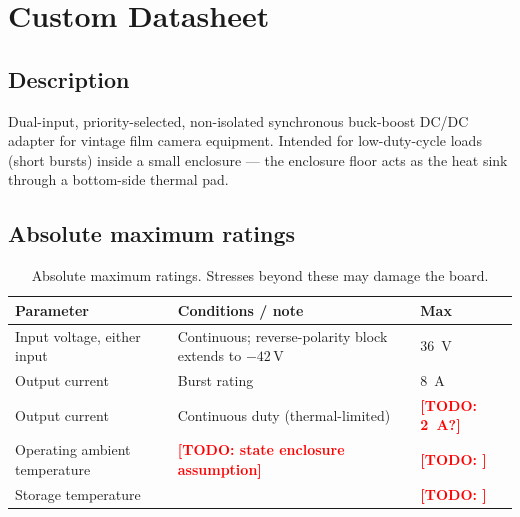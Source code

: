 \documentclass[11pt,a4paper]{article}
\newcommand{\todo}[1]{\textcolor{red}{\textbf{[TODO: #1]}}}
\begin{document}
\section{Custom Datasheet}
\label{sec:datasheet}

\subsection{Description}
Dual-input, priority-selected, non-isolated synchronous buck-boost DC/DC adapter
for vintage film camera equipment. Intended for low-duty-cycle loads (short
bursts) inside a small enclosure --- the enclosure floor acts as the heat sink
through a bottom-side thermal pad.

\subsection{Absolute maximum ratings}
\begin{table}[H]
  \centering
  \begin{tabularx}{\linewidth}{@{}lXl@{}}
    \toprule
    \textbf{Parameter} & \textbf{Conditions / note} & \textbf{Max} \\
    \midrule
    Input voltage, either input   & Continuous; reverse-polarity block extends to $-42$\,V      & \SI{36}{\V} \\
    Output current                & Burst rating                                                & \SI{8}{\A} \\
    Output current                & Continuous duty (thermal-limited)                           & \todo{\SI{2}{\A}?} \\
    Operating ambient temperature & \todo{state enclosure assumption}                           & \todo{} \\
    Storage temperature           &                                                             & \todo{} \\
    \bottomrule
  \end{tabularx}
  \caption{Absolute maximum ratings. Stresses beyond these may damage the board.}
\end{table}
\end{document}
